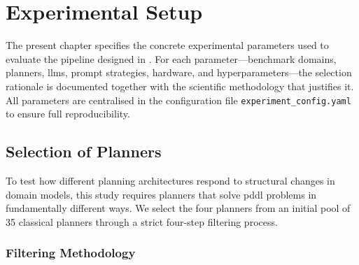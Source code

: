\chapter{Experimental Setup}\label{ch:experimental_setup}

The present chapter specifies the concrete experimental parameters used to evaluate the pipeline designed in .
For each parameter---benchmark domains, planners, \glspl{llm}, prompt strategies, hardware, and hyperparameters---the selection rationale is documented together with the scientific methodology that justifies it.
All parameters are centralised in the configuration file \texttt{experiment\_config.yaml} to ensure full reproducibility.


\section{Selection of Planners}
\label{sec:setup:planners}

To test how different planning architectures respond to structural changes in domain models, this study requires planners that solve \gls{pddl} problems in fundamentally different ways.
We select the four planners from an initial pool of 35 classical planners through a strict four-step filtering process.

\subsection{Filtering Methodology}

